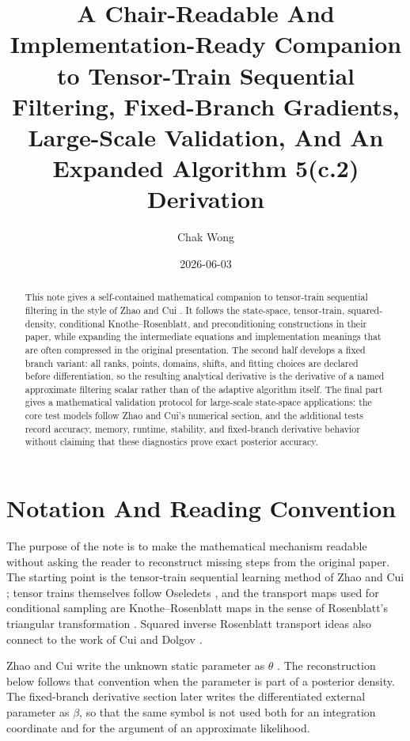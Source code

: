 \documentclass[11pt]{article}
\title{A Chair-Readable And Implementation-Ready Companion to Tensor-Train Sequential Filtering, Fixed-Branch Gradients, Large-Scale Validation, And An Expanded Algorithm 5(c.2) Derivation}
\author{Chak Wong}
\date{2026-06-03}
\numberwithin{equation}{section}
\begin{document}
\maketitle

\begin{abstract}
This note gives a self-contained mathematical companion to tensor-train
sequential filtering in the style of Zhao and Cui \cite{zhao2024ttsequential}.
It follows the state-space, tensor-train, squared-density, conditional
Knothe--Rosenblatt, and preconditioning constructions in their paper, while
expanding the intermediate equations and implementation meanings that are often
compressed in the original presentation.  The second half develops a fixed
branch variant: all ranks, points, domains, shifts, and fitting choices are
declared before differentiation, so the resulting analytical derivative is the
derivative of a named approximate filtering scalar rather than of the adaptive
algorithm itself.  The final part gives a mathematical validation protocol for
large-scale state-space applications: the core test models follow Zhao and
Cui's numerical section, and the additional tests record accuracy, memory,
runtime, stability, and fixed-branch derivative behavior without claiming that
these diagnostics prove exact posterior accuracy.
\end{abstract}

\tableofcontents

\section{Notation And Reading Convention}

The purpose of the note is to make the mathematical mechanism readable without
asking the reader to reconstruct missing steps from the original paper.  The
starting point is the tensor-train sequential learning method of Zhao and Cui
\cite{zhao2024ttsequential}; tensor trains themselves follow Oseledets
\cite{oseledets2011tt}, and the transport maps used for conditional sampling
are Knothe--Rosenblatt maps in the sense of Rosenblatt's triangular
transformation \cite{rosenblatt1952remarks}.  Squared inverse Rosenblatt
transport ideas also connect to the work of Cui and Dolgov
\cite{cui2021deep}.

Zhao and Cui write the unknown static parameter as \(\theta\)
\cite{zhao2024ttsequential}.  The reconstruction below follows that convention
when the parameter is part of a posterior density.  The fixed-branch derivative
section later writes the differentiated external parameter as \(\beta\), so
that the same symbol is not used both for an integration coordinate and for the
argument of an approximate likelihood.
\end{document}
